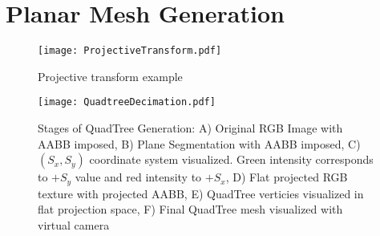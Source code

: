 \section{Planar Mesh Generation}
\begin{figure}[!h]
    \centering
    \texttt{[image: ProjectiveTransform.pdf]}
    \caption{Projective transform example}
    \label{fig:projectivetransform}
\end{figure}

\begin{figure}[!htbp]
    \centering
    \texttt{[image: QuadtreeDecimation.pdf]}
    \caption{Stages of QuadTree Generation: A) Original RGB Image with AABB imposed, B) Plane Segmentation with AABB imposed, C) $(S_x,S_y)$ coordinate system visualized. Green intensity corresponds to $+S_y$ value and red intensity to $+S_x$, D) Flat projected RGB texture with projected AABB, E) QuadTree verticies visualized in flat projection space, F) Final QuadTree mesh visualized with virtual camera}
    \label{fig:quadtreestages}
\end{figure}

